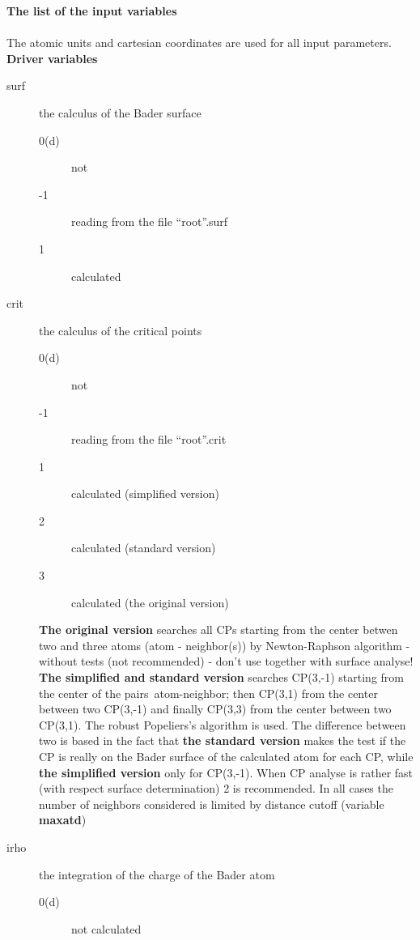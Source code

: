 \documentclass[11pt]{article}
\begin{document}
{\large \bf \centering The list of the input variables}\\ \\
The atomic units and cartesian coordinates are used for all input
parameters. \\

{\bf \centering  Driver variables}\\
\begin{description}
\item [surf] the calculus of the Bader surface
  \begin{description}
    \item [0(d)] not
    \item [-1] reading from the file ``root''.surf
    \item [1] calculated
  \end{description}
\item [crit] the calculus of the critical points
  \begin{description}
    \item [0(d)] not
    \item [-1] reading from the file ``root''.crit
    \item [1] calculated (simplified version)
    \item [2] calculated (standard version)
    \item [3] calculated (the original version)
  \end{description}
  {\bf The original version} searches all CPs starting from the center betwen
  two and three atoms (atom - neighbor(s)) by
  Newton-Raphson algorithm - without tests (not recommended) - don't
  use together with surface analyse!
{\bf The simplified and standard version} searches CP(3,-1) starting
  from the center of the pairs~atom-neighbor; then CP(3,1) from the
  center between two CP(3,-1) and finally CP(3,3) from the center
  between two CP(3,1). The robust Popeliers's algorithm is used.
  The difference between two is based in the fact
  that {\bf the standard version} makes the test if the CP is really
  on the Bader surface of the calculated atom for each CP, while
  {\bf the simplified version} only for CP(3,-1). When CP analyse is
  rather fast (with respect surface determination) 2 is recommended.
  In all cases the number of neighbors considered is limited by
  distance cutoff (variable {\bf maxatd})
\item [irho] the integration of the charge of the Bader atom
  \begin{description}
    \item [0(d)] not calculated

\end{description}
\end{description}
\end{document}
